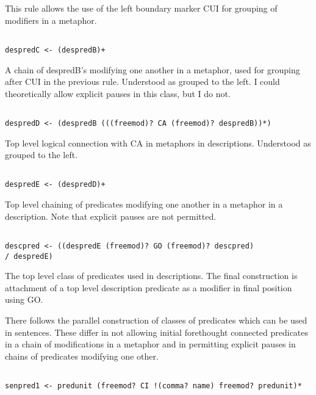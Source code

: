 \documentclass[12pt]{article}
\begin{document}
This rule allows the use of the left boundary marker CUI for grouping of modifiers in a metaphor.

\begin{verbatim}

despredC <- (despredB)+

\end{verbatim}

A chain of despredB's modifying one another in a metaphor, used for grouping after CUI in the previous rule.
Understood as grouped to the left.  I could theoretically allow explicit pauses in this class, but I do not.

\begin{verbatim}

despredD <- (despredB (((freemod)? CA (freemod)? despredB))*)

\end{verbatim}

Top level logical connection with CA in metaphors in descriptions.  Understood as grouped to the left.

\begin{verbatim}

despredE <- (despredD)+

\end{verbatim}

Top level chaining of predicates modifying one another in a metaphor in a description.  Note that explicit pauses are not permitted.

\begin{verbatim}

descpred <- ((despredE (freemod)? GO (freemod)? descpred) 
/ despredE)

\end{verbatim}

The top level class of predicates used in descriptions.  The final construction is attachment of a top level description predicate
as a modifier in final position using GO.

There follows the parallel construction of classes of predicates which can be used in sentences.  These differ in not allowing
initial forethought connected predicates in a chain of modifications in a metaphor and in permitting explicit pauses in chains of predicates modifying one other.

\begin{verbatim}

senpred1 <- predunit (freemod? CI !(comma? name) freemod? predunit)*

\end{verbatim}
\end{document}
